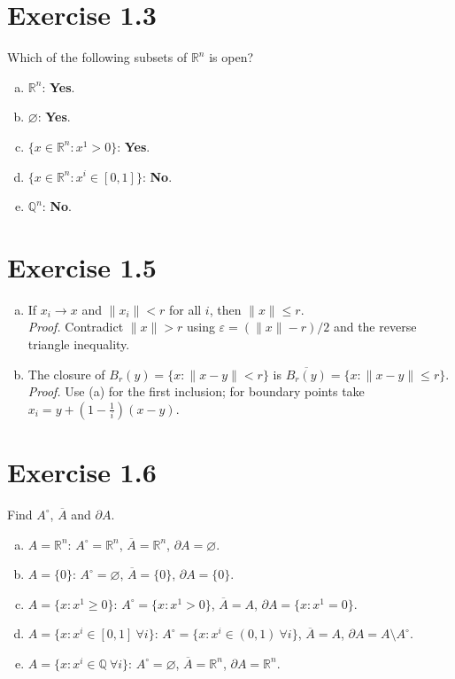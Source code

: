 \documentclass[11pt,a4paper]{article}
\begin{document}
\section*{Exercise 1.3}
Which of the following subsets of $\mathbb{R}^n$ is open?
\begin{enumerate}[a)]
\item $\mathbb{R}^n$: \textbf{Yes}.
\item $\varnothing$: \textbf{Yes}.
\item $\{x\in\mathbb{R}^n:x^1>0\}$: \textbf{Yes}.
\item $\{x\in\mathbb{R}^n:x^i\in[0,1]\}$: \textbf{No}.
\item $\mathbb{Q}^n$: \textbf{No}.
\end{enumerate}

\section*{Exercise 1.5}
\begin{enumerate}[a)]
\item If $x_i\to x$ and $\|x_i\|<r$ for all $i$, then $\|x\|\le r$.\\
\textit{Proof.} Contradict $\|x\|>r$ using $\varepsilon=(\|x\|-r)/2$ and the reverse triangle inequality.
\item The closure of $B_r(y)=\{x:\|x-y\|<r\}$ is $\overline{B_r(y)}=\{x:\|x-y\|\le r\}$.\\
\textit{Proof.} Use (a) for the first inclusion; for boundary points take $x_i=y+(1-\tfrac1i)(x-y)$.
\end{enumerate}

\section*{Exercise 1.6}
Find $A^\circ$, $\overline{A}$ and $\partial A$.
\begin{enumerate}[a)]
\item $A=\mathbb{R}^n$: $A^\circ=\mathbb{R}^n$, $\overline{A}=\mathbb{R}^n$, $\partial A=\varnothing$.
\item $A=\{0\}$: $A^\circ=\varnothing$, $\overline{A}=\{0\}$, $\partial A=\{0\}$.
\item $A=\{x:x^1\ge 0\}$: $A^\circ=\{x:x^1>0\}$, $\overline{A}=A$, $\partial A=\{x:x^1=0\}$.
\item $A=\{x:x^i\in[0,1]\ \forall i\}$: $A^\circ=\{x:x^i\in(0,1)\ \forall i\}$, $\overline{A}=A$, $\partial A=A\setminus A^\circ$.
\item $A=\{x:x^i\in\mathbb{Q}\ \forall i\}$: $A^\circ=\varnothing$, $\overline{A}=\mathbb{R}^n$, $\partial A=\mathbb{R}^n$.
\end{enumerate}
\end{document}

